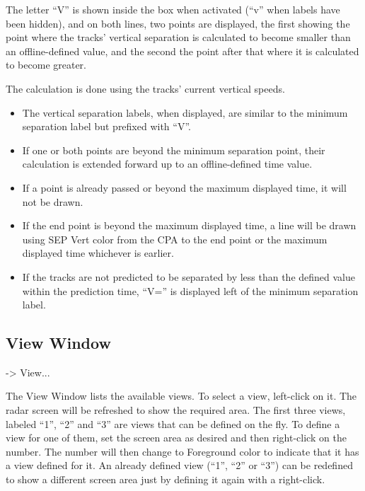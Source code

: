 \documentclass[a4paper,oneside,11pt]{memoir}
\newcommand{\colorref}[1]{\colorbox{Flight Highlight}{\color{#1}#1}}
\newcommand{\winref}[1]{\textit{\titleref{#1}}}
\newcommand\capdimage[2]{
\begin{center}
\hspace{1em}%
\vtop{%
\centering
\texttt{[image: \#1]}%
\captionof{figure}{#2}%
}%
\end{center}
\ignorespaces}
\begin{document}
\bigskip

The letter “V” is shown inside the box when activated (“v” when labels have been hidden), and on both lines, two points are displayed, the first showing the point where the tracks’ vertical separation is calculated to become smaller than an offline-defined value, and the second the point after that where it is calculated to become greater. 

\bigskip

The calculation is done using the tracks’ current vertical speeds.

\begin{itemize}
    \item The vertical separation labels, when displayed, are similar to the minimum separation label but prefixed with “V”.
    \item If one or both points are beyond the minimum separation point, their calculation is extended forward up to an offline-defined time value.
    \item If a point is already passed or beyond the maximum displayed time, it will not be drawn.
    \item If the end point is beyond the maximum displayed time, a line will be drawn using \colorref{SEP Vert} color from the CPA to the end point or the maximum displayed time whichever is earlier.
    \item If the tracks are not predicted to be separated by less than the defined value within the prediction time, “V=” is displayed left of the minimum separation label.
\end{itemize}

\subsection{View Window}
\label{win:view}
\winref{menu:radarm} -> View...

\bigskip

\capdimage{img/viewmenu.png}{View Window}

The View Window lists the available views. To select a view, left-click on it. The radar screen will be refreshed to show the required area. The first three views, labeled “1”, “2” and “3” are views that can be defined on the fly. To define a view for one of them, set the screen area as desired and then right-click on the number. The number will then change to \colorref{Foreground} color to indicate that it has a view defined for it. An already defined view (“1”, “2” or “3”) can be redefined to show a different screen area just by defining it again with a right-click.
\end{document}
